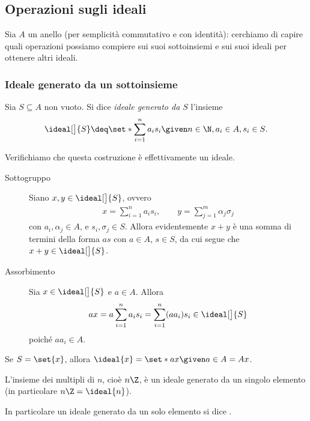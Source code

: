 \subsection{Operazioni sugli ideali}

Sia $A$ un anello (per semplicità commutativo e con identità): cerchiamo di capire quali operazioni possiamo compiere sui suoi sottoinsiemi e sui suoi ideali per ottenere altri ideali.

\subsubsection{Ideale generato da un sottoinsieme}

\begin{definition}
    Sia $S \subseteq A$ non vuoto. Si dice \emph{ideale generato da $S$} l'insieme \[
        \ideal[\big]{S} \deq \set*{\sum_{i=1}^n a_is_i \given n \in \N, a_i \in A, s_i \in S}.
    \]
\end{definition}

Verifichiamo che questa costruzione è effettivamente un ideale.
\begin{description}
    \item[Sottogruppo] Siano $x, y \in \ideal[\big]{S}$, ovvero \begin{align*}
        x = \sum_{i=1}^n a_is_i, \qquad y = \sum_{j=1}^m \alpha_j\sigma_j
    \end{align*} con $a_i, \alpha_j \in A$, e $s_i, \sigma_j \in S$.
    Allora evidentemente $x + y$ è una somma di termini della forma $as$ con $a \in A$, $s \in S$, da cui segue che $x + y \in \ideal[\big]{S}$.
    \item[Assorbimento] Sia $x \in \ideal[\big]{S}$ e $a \in A$. Allora \[
        ax = a\sum_{i=1}^n a_is_i =  \sum_{i=1}^n (aa_i)s_i \in \ideal[\big]{S}
    \] poiché $aa_i \in A$.
\end{description}

\begin{example}
    Se $S = \set{x}$, allora $\ideal{x} = \set*{ax \given a \in A} = Ax$.
\end{example}
\begin{example}
    L'insieme dei multipli di $n$, cioè $n\Z$, è un ideale generato da un singolo elemento (in particolare $n\Z = \ideal{n}$).
\end{example}

In particolare un ideale generato da un solo elemento si dice .

